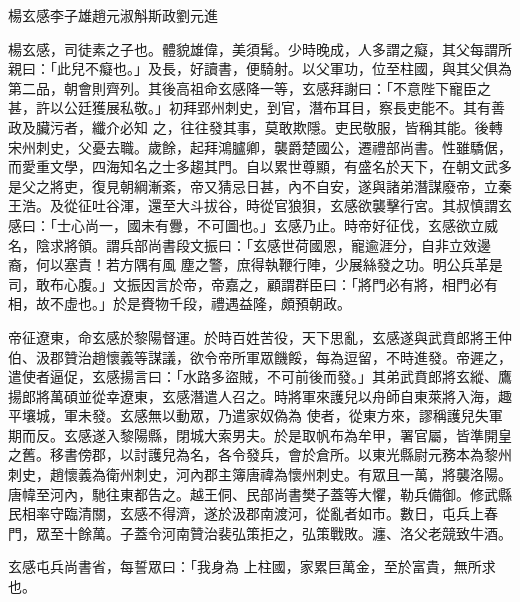 
\begin{pinyinscope}

 楊玄感李子雄趙元淑斛斯政劉元進



 楊玄感，司徒素之子也。體貌雄偉，美須髯。少時晚成，人多謂之癡，其父每謂所親曰：「此兒不癡也。」及長，好讀書，便騎射。以父軍功，位至柱國，與其父俱為第二品，朝會則齊列。其後高祖命玄感降一等，玄感拜謝曰：「不意陛下寵臣之甚，許以公廷獲展私敬。」初拜郢州刺史，到官，潛布耳目，察長吏能不。其有善政及臟污者，纖介必知
 之，往往發其事，莫敢欺隱。吏民敬服，皆稱其能。後轉宋州刺史，父憂去職。歲餘，起拜鴻臚卿，襲爵楚國公，遷禮部尚書。性雖驕倨，而愛重文學，四海知名之士多趨其門。自以累世尊顯，有盛名於天下，在朝文武多是父之將吏，復見朝綱漸紊，帝又猜忌日甚，內不自安，遂與諸弟潛謀廢帝，立秦王浩。及從征吐谷渾，還至大斗拔谷，時從官狼狽，玄感欲襲擊行宮。其叔慎謂玄感曰：「士心尚一，國未有釁，不可圖也。」玄感乃止。時帝好征伐，玄感欲立威名，陰求將領。謂兵部尚書段文振曰：「玄感世荷國恩，寵逾涯分，自非立效邊裔，何以塞責！若方隅有風
 塵之警，庶得執鞭行陣，少展絲發之功。明公兵革是司，敢布心腹。」文振因言於帝，帝嘉之，顧謂群臣曰：「將門必有將，相門必有相，故不虛也。」於是賚物千段，禮遇益隆，頗預朝政。



 帝征遼東，命玄感於黎陽督運。於時百姓苦役，天下思亂，玄感遂與武賁郎將王仲伯、汲郡贊治趙懷義等謀議，欲令帝所軍眾饑餒，每為逗留，不時進發。帝遲之，遣使者逼促，玄感揚言曰：「水路多盜賊，不可前後而發。」其弟武賁郎將玄縱、鷹揚郎將萬碩並從幸遼東，玄感潛遣人召之。時將軍來護兒以舟師自東萊將入海，趣平壤城，軍未發。玄感無以動眾，乃遣家奴偽為
 使者，從東方來，謬稱護兒失軍期而反。玄感遂入黎陽縣，閉城大索男夫。於是取帆布為牟甲，署官屬，皆準開皇之舊。移書傍郡，以討護兒為名，各令發兵，會於倉所。以東光縣尉元務本為黎州刺史，趙懷義為衛州刺史，河內郡主簿唐禕為懷州刺史。有眾且一萬，將襲洛陽。唐幃至河內，馳往東都告之。越王侗、民部尚書樊子蓋等大懼，勒兵備御。修武縣民相率守臨清關，玄感不得濟，遂於汲郡南渡河，從亂者如市。數日，屯兵上春門，眾至十餘萬。子蓋令河南贊治裴弘策拒之，弘策戰敗。瀍、洛父老競致牛酒。



 玄感屯兵尚書省，每誓眾曰：「我身為
 上柱國，家累巨萬金，至於富貴，無所求也。




\end{pinyinscope}
